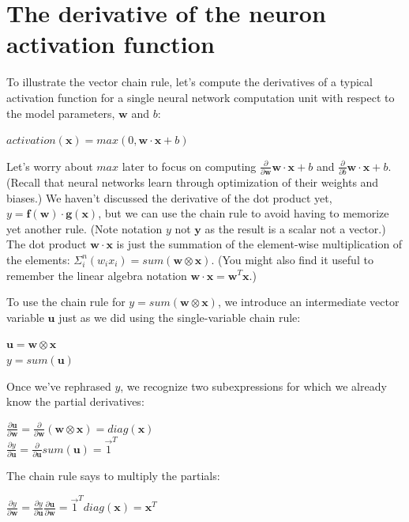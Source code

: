 \documentclass[11pt]{article}
\begin{document}
\section{The derivative of the neuron activation function}

To illustrate the vector chain rule, let's compute the derivatives of a typical activation function for a single neural network computation unit with respect to the model parameters, $\mathbf{w}$ and $b$:

$activation(\mathbf{x}) = max(0, \mathbf{w} \cdot \mathbf{x} + b)$

Let's worry about $max$ later to focus on computing $\frac{\partial}{\partial \mathbf{w}} \mathbf{w} \cdot \mathbf{x} + b$ and $\frac{\partial}{\partial b} \mathbf{w} \cdot \mathbf{x} + b$. (Recall that neural networks learn through optimization of their weights and biases.)  We haven't discussed the derivative of the dot product yet, $y = \mathbf{f(w)} \cdot \mathbf{g(x)}$, but we can use the chain rule to avoid having to memorize yet another rule. (Note notation $y$ not $\mathbf{y}$ as the result is a scalar not a vector.) The dot product $\mathbf{w} \cdot \mathbf{x}$ is just the summation of the element-wise multiplication of the elements: $\Sigma_i^n (w_i x_i) = sum(\mathbf{w} \otimes \mathbf{x})$. (You might also find it useful to remember the linear algebra notation $\mathbf{w} \cdot \mathbf{x} = \mathbf{w}^{T} \mathbf{x}$.)  

To use the chain rule for $y = sum(\mathbf{w} \otimes \mathbf{x})$, we introduce an intermediate vector variable $\mathbf{u}$ just as we did using the single-variable chain rule:

$\mathbf{u} = \mathbf{w} \otimes \mathbf{x}$\\
$y = sum(\mathbf{u})$

Once we've rephrased $y$, we recognize two subexpressions for which we already know the partial derivatives:

$\frac{\partial  \mathbf{u}}{\partial \mathbf{w}} = \frac{\partial }{\partial \mathbf{w}} (\mathbf{w} \otimes \mathbf{x}) = diag(\mathbf{x})$\\
$\frac{\partial y}{\partial \mathbf{u}} = \frac{\partial }{\partial \mathbf{u}} sum(\mathbf{u}) = \vec{1}^T$

The chain rule says to multiply the partials:

$\frac{\partial y}{\partial \mathbf{w}} = \frac{\partial y}{\partial \mathbf{u}} \frac{\partial \mathbf{u}}{\partial \mathbf{w}} = \vec{1}^T  diag(\mathbf{x}) = \mathbf{x}^T$
\end{document}
